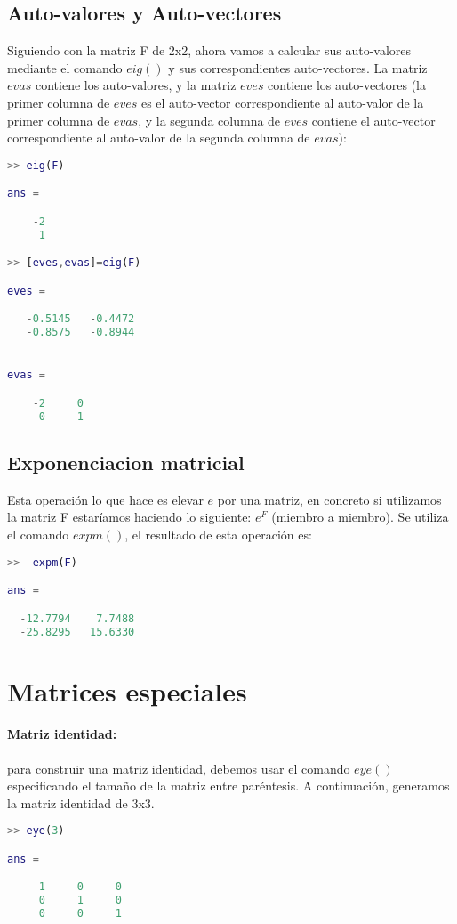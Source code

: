 \subsection{Auto-valores y Auto-vectores}
Siguiendo con la matriz F de 2x2, ahora vamos a calcular sus auto-valores mediante el comando $eig()$ y sus correspondientes auto-vectores. La matriz $evas$ contiene los auto-valores, y la matriz $eves$ contiene los auto-vectores (la primer columna de $eves$ es el auto-vector correspondiente al auto-valor de la primer columna de $evas$, y la segunda columna de $eves$ contiene el auto-vector correspondiente al auto-valor de la segunda columna de $evas$):
\begin{lstlisting}[language=Matlab]
>> eig(F)

ans =

    -2
     1

>> [eves,evas]=eig(F)

eves =

   -0.5145   -0.4472
   -0.8575   -0.8944


evas =

    -2     0
     0     1

\end{lstlisting}


\subsection{Exponenciacion matricial}
Esta operación lo que hace es elevar $e$ por una matriz, en concreto si utilizamos la matriz F estaríamos haciendo lo siguiente: $e^{F}$ (miembro a miembro). Se utiliza el comando $expm()$, el resultado de esta operación es:
\begin{lstlisting}[language=Matlab]
>>  expm(F)

ans =

  -12.7794    7.7488
  -25.8295   15.6330

\end{lstlisting}


\section{Matrices especiales}

\paragraph{Matriz identidad:} para construir una matriz identidad, debemos usar el comando $eye()$ especificando el tamaño de la matriz entre paréntesis. A continuación, generamos la matriz identidad de 3x3.
\begin{lstlisting}[language=Matlab]
>> eye(3)

ans =

     1     0     0
     0     1     0
     0     0     1

\end{lstlisting}

